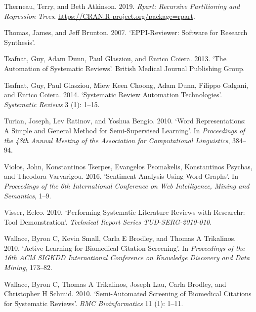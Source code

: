 \documentclass{article}
\newlength{\cslhangindent}
\newlength{\cslentryspacingunit} %
\newenvironment{CSLReferences}[2] %
 {%
  \setlength{\parindent}{0pt}
  \ifodd #1
  \let\oldpar\par
  \def\par{\hangindent=\cslhangindent\oldpar}
  \fi
  \setlength{\parskip}{#2\cslentryspacingunit}
 }%
 {}
\begin{document}
\begin{CSLReferences}{1}{0}
\leavevmode{}%
Therneau, Terry, and Beth Atkinson. 2019. \emph{Rpart: Recursive
Partitioning and Regression Trees}.
\url{https://CRAN.R-project.org/package=rpart}.

\leavevmode{}%
Thomas, James, and Jeff Brunton. 2007. {`EPPI-Reviewer: Software for
Research Synthesis'}.

\leavevmode{}%
Tsafnat, Guy, Adam Dunn, Paul Glasziou, and Enrico Coiera. 2013. {`The
Automation of Systematic Reviews'}. British Medical Journal Publishing
Group.

\leavevmode{}%
Tsafnat, Guy, Paul Glasziou, Miew Keen Choong, Adam Dunn, Filippo
Galgani, and Enrico Coiera. 2014. {`Systematic Review Automation
Technologies'}. \emph{Systematic Reviews} 3 (1): 1--15.

\leavevmode{}%
Turian, Joseph, Lev Ratinov, and Yoshua Bengio. 2010. {`Word
Representations: A Simple and General Method for Semi-Supervised
Learning'}. In \emph{Proceedings of the 48th Annual Meeting of the
Association for Computational Linguistics}, 384--94.

\leavevmode{}%
Violos, John, Konstantinos Tserpes, Evangelos Psomakelis, Konstantinos
Psychas, and Theodora Varvarigou. 2016. {`Sentiment Analysis Using
Word-Graphs'}. In \emph{Proceedings of the 6th International Conference
on Web Intelligence, Mining and Semantics}, 1--9.

\leavevmode{}%
Visser, Eelco. 2010. {`Performing Systematic Literature Reviews with
Researchr: Tool Demonstration'}. \emph{Technical Report Series
TUD-SERG-2010-010}.

\leavevmode{}%
Wallace, Byron C, Kevin Small, Carla E Brodley, and Thomas A Trikalinos.
2010. {`Active Learning for Biomedical Citation Screening'}. In
\emph{Proceedings of the 16th ACM SIGKDD International Conference on
Knowledge Discovery and Data Mining}, 173--82.

\leavevmode{}%
Wallace, Byron C, Thomas A Trikalinos, Joseph Lau, Carla Brodley, and
Christopher H Schmid. 2010. {`Semi-Automated Screening of Biomedical
Citations for Systematic Reviews'}. \emph{BMC Bioinformatics} 11 (1):
1--11.


\end{CSLReferences}
\end{document}
